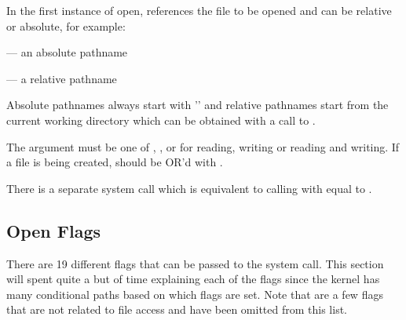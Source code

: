 \noindent
In the first instance of open,  references the file to be opened and can be relative or absolute, for example:

\vspace{10px}
     --- an absolute pathname
    
\vspace{5px}
      --- a relative pathname
\vspace{10px}

\noindent
Absolute pathnames always start with '\cf{/}' and relative pathnames start from the current working directory which can be obtained with a call to .

The  argument must be one of ,  ,  or   for reading, writing or reading and writing. If a file is being created,  should be OR'd with .

There is a separate  system call which is equivalent to calling  with  equal to .

\subsection{Open Flags}\label{prog-open-flags}

There are 19 different flags that can be passed to the  system call. This section will spent quite a but of time explaining each of the flags since the kernel has many conditional paths based on which flags are set. Note that are a few flags that are not related to file access and have been omitted from this list.

